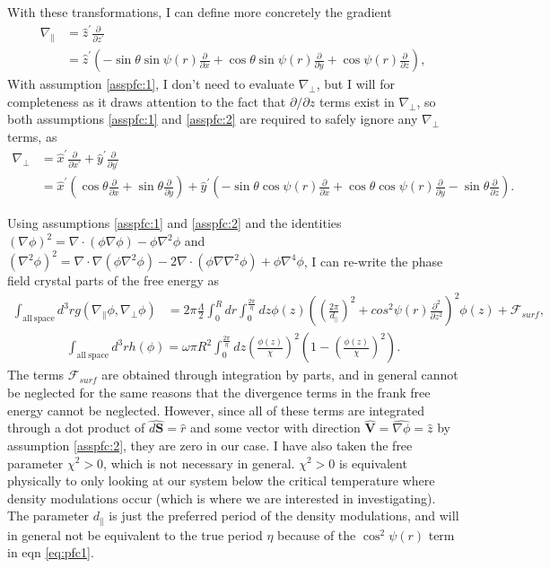 \documentclass[12pt]{article}
\begin{document}
With these transformations, I can define more concretely the gradient
\begin{align}
\nabla_{\parallel}&=\hat{z}^{\prime}\frac{\partial}{\partial z^{\prime}}\nonumber\\
&=\hat{z}^{\prime}\left(-\sin\theta\sin\psi(r)\frac{\partial}{\partial x}+\cos\theta\sin\psi(r)\frac{\partial}{\partial y}+\cos\psi(r)\frac{\partial}{\partial z}\right),
\end{align}
With assumption \ref{asspfc:1}, I don't need to evaluate $\nabla_{\bot}$, but I will for completeness as it draws attention to the fact that $\partial/\partial z$ terms exist in $\nabla_{\bot}$, so both assumptions \ref{asspfc:1} and \ref{asspfc:2} are required to safely ignore any $\nabla_{\bot}$ terms, as
\begin{align}
\nabla_{\bot}&=\hat{x}^{\prime}\frac{\partial}{\partial x^{\prime}}+\hat{y}^{\prime}\frac{\partial}{\partial y^{\prime}}\nonumber\\
&=\hat{x}^{\prime}\left(\cos\theta\frac{\partial}{\partial x}+\sin\theta\frac{\partial}{\partial y}\right)+\hat{y}^{\prime}\left(-\sin\theta\cos\psi(r)\frac{\partial}{\partial x}+\cos\theta\cos\psi(r)\frac{\partial}{\partial y}-\sin\theta\frac{\partial}{\partial z}\right).
\end{align}

Using assumptions \ref{asspfc:1} and \ref{asspfc:2} and the identities $(\nabla\phi)^2=\nabla\cdot(\phi\nabla\phi)-\phi\nabla^2\phi$ and $(\nabla^2\phi)^2=\nabla\cdot\nabla(\phi\nabla^2\phi)-2\nabla\cdot(\phi\nabla\nabla^2\phi)+\phi\nabla^4\phi$, I can re-write the phase field crystal parts of the free energy as
\begin{align}\label{eq:pfc1}
\int_{\mathrm{all\:space}}d^3rg(\nabla_{\parallel}\phi,\nabla_{\bot}\phi)&=2\pi\frac{\Lambda}{2}\int_0^Rdr\int_0^{\frac{2\pi}{\eta}}dz\phi(z)\left(\left(\frac{2\pi}{d_{\parallel}}\right)^2+cos^2\psi(r)\frac{\partial^2}{\partial z^2}\right)^2\phi(z)+\mathcal{F}_{surf},
\end{align}
\begin{align}
\int_{\mathrm{all\:space}}d^3rh(\phi)=\omega\pi R^2\int_0^{\frac{2\pi}{\eta}}dz\left(\frac{\phi(z)}{\chi}\right)^2\left(1-\left(\frac{\phi(z)}{\chi}\right)^2\right).
\end{align}
The terms $\mathcal{F}_{surf}$ are obtained through integration by parts, and in general cannot be neglected for the same reasons that the divergence terms in the frank free energy cannot be neglected. However, since all of these terms are integrated through a dot product of $\hat{d\bm{S}}=\hat{r}$ and some vector with direction $\hat{\bm{V}}=\hat{\nabla\phi}=\hat{z}$ by assumption \ref{asspfc:2}, they are zero in our case. I have also taken the free parameter $\chi^2>0$, which is not necessary in general. $\chi^2>0$ is equivalent physically to only looking at our system below the critical temperature where density modulations occur (which is where we are interested in investigating). The parameter $d_{\parallel}$ is just the preferred period of the density modulations, and will in general not be equivalent to the true period $\eta$ because of the $\cos^2\psi(r)$ term in eqn \ref{eq:pfc1}.
\end{document}

